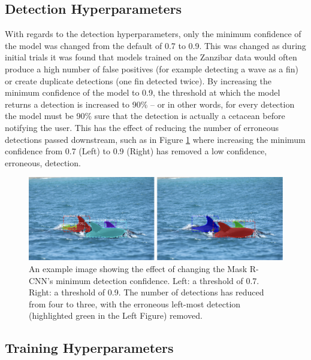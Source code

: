 \subsection{Detection Hyperparameters}\label{ch:cetDet,sec:ModelSelection,sub:DetectionHyperparameters}
 
 With regards to the detection hyperparameters, only the minimum confidence of the model was changed from the default of 0.7 to 0.9. This was changed as during initial trials it was found that models trained on the Zanzibar data would often produce a high number of false positives (for example detecting a wave as a fin) or create duplicate detections (one fin detected twice). By increasing the minimum confidence of the model to 0.9, the threshold at which the model returns a detection is increased to 90\% -- or in other words, for every detection the model must be 90\% sure that the detection is actually a cetacean before notifying the user. This has the effect of reducing the number of erroneous detections passed downstream, such as in Figure \ref{fig:min-conf} where increasing the minimum confidence from 0.7 (Left) to 0.9 (Right) has removed a low confidence, erroneous, detection. 
 
\begin{figure}[h]
	\begin{center}
		\includegraphics[scale=0.55]{Chapter3/figs/min-conf-eg.png}
	\end{center}
	\caption[An example image showing the effect of changing the Mask R-CNN's minimum detection confidence.]{An example image showing the effect of changing the Mask R-CNN's minimum detection confidence. Left: a threshold of 0.7. Right: a threshold of 0.9. The number of detections has reduced from four to three, with the erroneous left-most detection (highlighted green in the Left Figure) removed.}
	\label{fig:min-conf}
\end{figure}
 
 
\subsection{Training Hyperparameters}\label{ch:cetDet,sec:ModelSelection,sub:TrainingHyperparameters}

